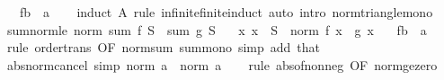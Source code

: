 \begin{isabellebody}
\ \ \ f{\isacharcolon}{\kern0pt}{\isacharcolon}{\kern0pt}{\isachardoublequoteopen}{\isacharprime}{\kern0pt}b\ {\isasymRightarrow}\ {\isacharprime}{\kern0pt}a{\isachardoublequoteclose}\isanewline
%
\isadelimproof
\ \ %
\endisadelimproof
%
\isatagproof
{}\isamarkupfalse%
\ {\isacharparenleft}{\kern0pt}induct\ A\ rule{\isacharcolon}{\kern0pt}\ infinite{\isacharunderscore}{\kern0pt}finite{\isacharunderscore}{\kern0pt}induct{\isacharparenright}{\kern0pt}\ {\isacharparenleft}{\kern0pt}auto\ intro{\isacharcolon}{\kern0pt}\ norm{\isacharunderscore}{\kern0pt}triangle{\isacharunderscore}{\kern0pt}mono{\isacharparenright}{\kern0pt}%
\endisatagproof
{\isafoldproof}%
%
\isadelimproof
\isanewline
%
\endisadelimproof
\isanewline
{}\isamarkupfalse%
\ sum{\isacharunderscore}{\kern0pt}norm{\isacharunderscore}{\kern0pt}le{\isacharcolon}{\kern0pt}\ {\isachardoublequoteopen}norm\ {\isacharparenleft}{\kern0pt}sum\ f\ S{\isacharparenright}{\kern0pt}\ {\isasymle}\ sum\ g\ S{\isachardoublequoteclose}\isanewline
\ \ \ {\isachardoublequoteopen}{\isasymAnd}x{\isachardot}{\kern0pt}\ x\ {\isasymin}\ S\ {\isasymLongrightarrow}\ norm\ {\isacharparenleft}{\kern0pt}f\ x{\isacharparenright}{\kern0pt}\ {\isasymle}\ g\ x{\isachardoublequoteclose}\isanewline
\ \ \ f{\isacharcolon}{\kern0pt}{\isacharcolon}{\kern0pt}{\isachardoublequoteopen}{\isacharprime}{\kern0pt}b\ {\isasymRightarrow}\ {\isacharprime}{\kern0pt}a{\isachardoublequoteclose}\isanewline
%
\isadelimproof
\ \ %
\endisadelimproof
%
\isatagproof
{}\isamarkupfalse%
\ {\isacharparenleft}{\kern0pt}rule\ order{\isacharunderscore}{\kern0pt}trans\ {\isacharbrackleft}{\kern0pt}OF\ norm{\isacharunderscore}{\kern0pt}sum\ sum{\isacharunderscore}{\kern0pt}mono{\isacharbrackright}{\kern0pt}{\isacharparenright}{\kern0pt}\ {\isacharparenleft}{\kern0pt}simp\ add{\isacharcolon}{\kern0pt}\ that{\isacharparenright}{\kern0pt}%
\endisatagproof
{\isafoldproof}%
%
\isadelimproof
\isanewline
%
\endisadelimproof
\isanewline
{}\isamarkupfalse%
\ abs{\isacharunderscore}{\kern0pt}norm{\isacharunderscore}{\kern0pt}cancel\ {\isacharbrackleft}{\kern0pt}simp{\isacharbrackright}{\kern0pt}{\isacharcolon}{\kern0pt}\ {\isachardoublequoteopen}{\isasymbar}norm\ a{\isasymbar}\ {\isacharequal}{\kern0pt}\ norm\ a{\isachardoublequoteclose}\isanewline
%
\isadelimproof
\ \ %
\endisadelimproof
%
\isatagproof
{}\isamarkupfalse%
\ {\isacharparenleft}{\kern0pt}rule\ abs{\isacharunderscore}{\kern0pt}of{\isacharunderscore}{\kern0pt}nonneg\ {\isacharbrackleft}{\kern0pt}OF\ norm{\isacharunderscore}{\kern0pt}ge{\isacharunderscore}{\kern0pt}zero{\isacharbrackright}{\kern0pt}{\isacharparenright}{\kern0pt}%

\end{isabellebody}
